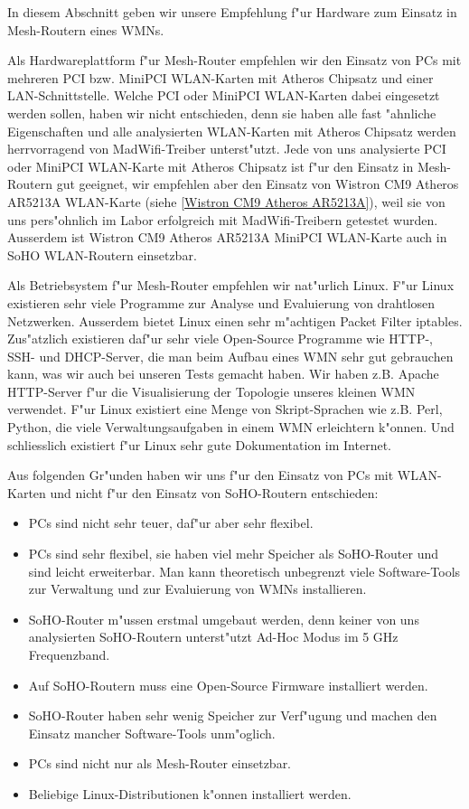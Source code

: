 In diesem Abschnitt geben wir unsere Empfehlung f"ur Hardware zum Einsatz in
Mesh-Routern eines WMNs.

Als Hardwareplattform f"ur Mesh-Router empfehlen wir den Einsatz von PCs mit
mehreren PCI bzw. MiniPCI WLAN-Karten mit Atheros Chipsatz und einer
LAN-Schnittstelle. Welche PCI oder MiniPCI WLAN-Karten dabei eingesetzt
werden sollen, haben wir nicht entschieden, denn sie haben alle fast
"ahnliche Eigenschaften und alle analysierten WLAN-Karten mit Atheros
Chipsatz werden herrvorragend von MadWifi-Treiber unterst"utzt.
Jede von uns analysierte PCI oder MiniPCI WLAN-Karte mit Atheros
Chipsatz ist f"ur den Einsatz in Mesh-Routern gut geeignet, wir empfehlen
aber den Einsatz von Wistron CM9 Atheros AR5213A WLAN-Karte
(siehe \ref{Wistron CM9 Atheros AR5213A}), weil sie von uns pers"ohnlich
im Labor erfolgreich mit MadWifi-Treibern getestet wurden.
Ausserdem ist Wistron CM9 Atheros AR5213A MiniPCI WLAN-Karte auch
in SoHO WLAN-Routern einsetzbar.

Als Betriebsystem f"ur Mesh-Router empfehlen wir nat"urlich Linux.
F"ur Linux existieren sehr viele Programme zur Analyse und Evaluierung
von drahtlosen Netzwerken. Ausserdem bietet Linux einen sehr m"achtigen
Packet Filter iptables. Zus"atzlich existieren daf"ur sehr viele Open-Source
Programme wie HTTP-, SSH- und DHCP-Server, die man beim Aufbau eines WMN sehr
gut gebrauchen kann, was wir auch bei unseren Tests gemacht haben.
Wir haben z.B. Apache HTTP-Server f"ur die Visualisierung der Topologie
unseres kleinen WMN verwendet. F"ur Linux existiert eine Menge von
Skript-Sprachen wie z.B. Perl, Python, die viele Verwaltungsaufgaben
in einem WMN erleichtern k"onnen. Und schliesslich existiert f"ur Linux
sehr gute Dokumentation im Internet.

Aus folgenden Gr"unden haben wir uns f"ur den Einsatz von PCs mit
WLAN-Karten und nicht f"ur den Einsatz von SoHO-Routern entschieden:

\begin{itemize}
\item PCs sind nicht sehr teuer, daf"ur aber sehr flexibel.
\item PCs sind sehr flexibel, sie haben viel mehr Speicher als SoHO-Router
und sind leicht erweiterbar. Man kann theoretisch unbegrenzt viele Software-Tools
zur Verwaltung und zur Evaluierung von WMNs installieren.
\item SoHO-Router m"ussen erstmal umgebaut werden, denn keiner von uns
analysierten SoHO-Routern unterst"utzt Ad-Hoc Modus im 5 GHz Frequenzband.
\item Auf SoHO-Routern muss eine Open-Source Firmware installiert werden.
\item SoHO-Router haben sehr wenig Speicher zur Verf"ugung und machen
den Einsatz mancher Software-Tools unm"oglich.
\item PCs sind nicht nur als Mesh-Router einsetzbar.
\item Beliebige Linux-Distributionen k"onnen installiert werden.
\end{itemize}


